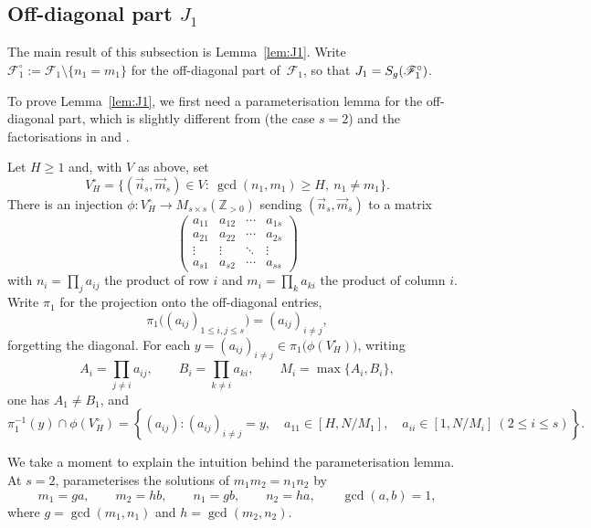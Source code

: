 \subsection{\texorpdfstring{Off-diagonal part $J_1$}{Off-diagonal part J_1}}
\label{sec:off-diagonal}

The main result of this subsection is Lemma~\ref{lem:J1}.
Write $\mathscr{F}_1^\circ:=\mathscr{F}_1\setminus\{n_1=m_1\}$ for the off-diagonal part of~$\mathscr{F}_1$, so that $J_1=S_g\!\left(\mathscr{F}_1^\circ\right)$.

To prove Lemma~\ref{lem:J1}, we first need a parameterisation lemma for the off-diagonal part, which is slightly
different from \cite[Lemma~3.4]{KX} (the case $s=2$) and the factorisations in
\cite[Lemma~2.3]{BNR} and \cite[\S8]{VW}. 
\begin{lemma}\label{lem:param-general}
Let $H\geq 1$ and, with \(V\) as above, set
\[
V_H^\circ=\bigl\{(\vec{n}_s,\vec{m}_s)\in V:\ \gcd(n_1,m_1)\geq H,\ n_1\neq m_1\bigr\}.
\]
There is an injection $\phi\colon V_H^\circ\to M_{s\times s}(\mathbb{Z}_{>0})$ sending $(\vec{n}_s,\vec{m}_s)$ to a matrix
\[
\begin{pmatrix}
a_{11} & a_{12} & \cdots & a_{1s} \\
a_{21} & a_{22} & \cdots & a_{2s} \\
\vdots & \vdots & \ddots & \vdots \\
a_{s1} & a_{s2} & \cdots & a_{ss}
\end{pmatrix}
\]
with $n_i=\prod_j a_{ij}$ the product of row $i$ and $m_i=\prod_k a_{ki}$ the product of column $i$.
Write $\pi_1$ for the projection onto the off-diagonal entries,
\[
\pi_1\bigl((a_{ij})_{1\leq i,j\leq s}\bigr)
=(a_{ij})_{i\neq j},
\]
forgetting the diagonal.
For each $y=(a_{ij})_{i\neq j}\in\pi_1\bigl(\phi(V_H^\circ)\bigr)$, writing
\[
A_i=\prod_{j\neq i}a_{ij},\qquad B_i=\prod_{k\neq i}a_{ki},\qquad M_i=\max\{A_i,B_i\},
\]
one has $A_1\neq B_1$, and
\begin{equation}\label{eq:fibre-general}
\pi_1^{-1}(y)\cap\phi(V_H^\circ)
=\left\{
(a_{ij}):
(a_{ij})_{i\neq j}=y,\quad
a_{11}\in[H,N/M_1],\quad
a_{ii}\in[1,N/M_i]\ (2\leq i\leq s)
\right\}.
\end{equation}
\end{lemma}
We take a moment to explain the intuition behind the parameterisation lemma.
At \(s=2\), \cite[Lemma~3.4]{KX} parameterises the solutions of \(m_1m_2=n_1n_2\) by
\[
m_1=ga,\qquad m_2=hb,\qquad n_1=gb,\qquad n_2=ha,
\qquad \gcd(a,b)=1,
\]
where \(g=\gcd(m_1,n_1)\) and \(h=\gcd(m_2,n_2)\).

